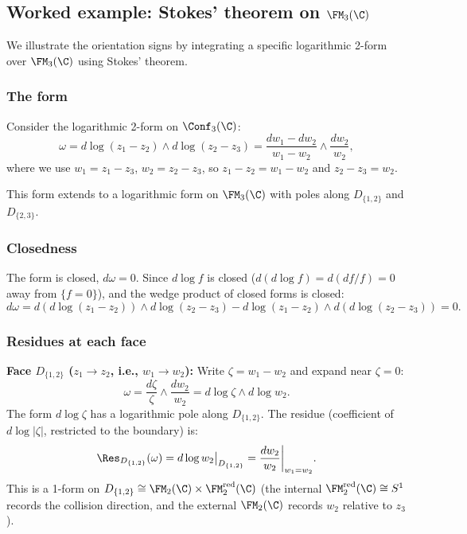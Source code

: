 \subsection{\texorpdfstring{Worked example: Stokes' theorem on $\FM_3(\C)$}{Worked example: Stokes' theorem on FM 3(C)}}
\label{subsec:stokes-FM3}

We illustrate the orientation signs by integrating a specific logarithmic 2-form over $\FM_3(\C)$ using Stokes' theorem.

\subsubsection{The form}

Consider the logarithmic 2-form on $\Conf_3(\C)$:
\begin{equation}
\label{eq:stokes-example-form}
\omega = d\log(z_1 - z_2)\wedge d\log(z_2 - z_3) = \frac{dw_1 - dw_2}{w_1 - w_2}\wedge \frac{dw_2}{w_2},
\end{equation}
where we use $w_1 = z_1 - z_3$, $w_2 = z_2 - z_3$, so $z_1 - z_2 = w_1 - w_2$ and $z_2 - z_3 = w_2$.

This form extends to a logarithmic form on $\FM_3(\C)$ with poles along $D_{\{1,2\}}$ and $D_{\{2,3\}}$.

\subsubsection{Closedness}

The form is closed, $d\omega = 0$. Since $d\log f$ is closed ($d(d\log f) = d(df/f) = 0$ away from $\{f=0\}$), and the wedge product of closed forms is closed:
\[
d\omega = d(d\log(z_1-z_2))\wedge d\log(z_2-z_3) - d\log(z_1-z_2)\wedge d(d\log(z_2-z_3)) = 0.
\]

\subsubsection{Residues at each face}

\textbf{Face $D_{\{1,2\}}$ ($z_1\to z_2$, i.e., $w_1\to w_2$):}
Write $\zeta = w_1 - w_2$ and expand near $\zeta = 0$:
\[
\omega = \frac{d\zeta}{\zeta}\wedge\frac{dw_2}{w_2} = d\log\zeta\wedge d\log w_2.
\]
The form $d\log\zeta$ has a logarithmic pole along $D_{\{1,2\}}$. The residue (coefficient of $d\log|\zeta|$, restricted to the boundary) is:
\[
\Res_{D_{\{1,2\}}}(\omega) = d\log w_2\big|_{D_{\{1,2\}}} = \frac{dw_2}{w_2}\bigg|_{w_1=w_2}.
\]
This is a 1-form on $D_{\{1,2\}} \cong \FM_2(\C)\times\FM_2^{\mathrm{red}}(\C)$ (the internal $\FM_2^{\mathrm{red}}(\C) \cong S^1$ records the collision direction, and the external $\FM_2(\C)$ records $w_2$ relative to $z_3$).

